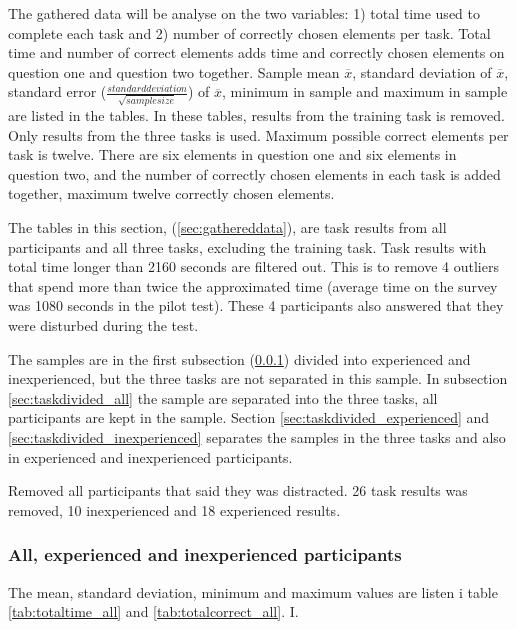 The gathered data will be analyse on the two variables: 1) total time used to complete each task and 2) number of correctly chosen elements per task. Total time and number of correct elements adds time and correctly chosen elements on question one and question two together. Sample mean $\overline{x}$, standard deviation of $\overline{x}$, standard error ($\frac{standard deviation}{\sqrt{sample size}}$) of $\overline{x}$, minimum in sample and maximum in sample are listed in the tables. In these tables, results from the training task is removed. Only results from the three tasks is used. Maximum possible correct elements per task is twelve. There are six elements in question one and six elements in question two, and the number of correctly chosen elements in each task is added together, maximum twelve correctly chosen elements.

The tables in this section, (\ref{sec:gathereddata}), are task results from all participants and all three tasks, excluding the training task. Task results with total time longer than 2160 seconds are filtered out. This is to remove 4 outliers that spend more than twice the approximated time (average time on the survey was 1080 seconds in the pilot test). These 4 participants also answered that they were disturbed during the test.

 The samples are in the first subsection (\ref{sec:alltasks}) divided into experienced and inexperienced, but the three tasks are not separated in this sample. In subsection \ref{sec:taskdivided_all} the sample are separated into the three tasks, all participants are kept in the sample. Section \ref{sec:taskdivided_experienced}  and \ref{sec:taskdivided_inexperienced} separates the samples in the three tasks and also in experienced and inexperienced participants. 
 
Removed all participants that said they was distracted. 26 task results was removed, 10 inexperienced and 18 experienced results.

\subsubsection{All,  experienced and inexperienced participants}\label{sec:alltasks}

The mean, standard deviation, minimum and maximum values are listen i table \ref{tab:totaltime_all} and \ref{tab:totalcorrect_all}. I. 

